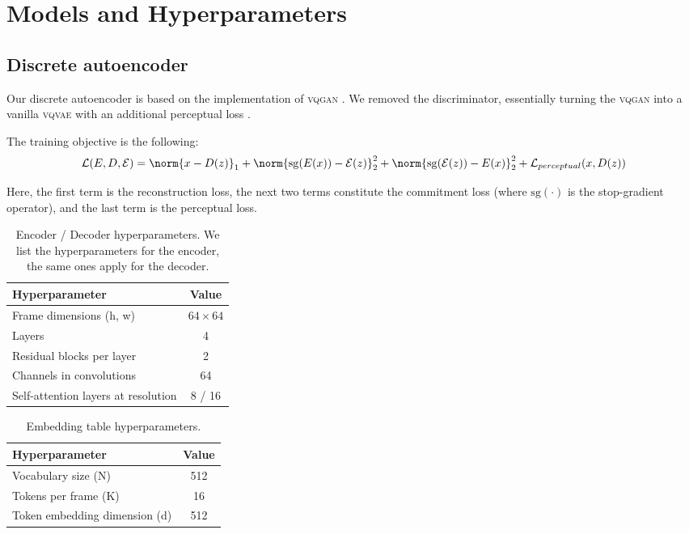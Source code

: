 \section{Models and Hyperparameters}
\label{appendix:architectures}

\subsection{Discrete autoencoder}

Our discrete autoencoder is based on the implementation of \textsc{vqgan} \citep{vqgan}. We removed the discriminator, essentially turning the \textsc{vqgan} into a vanilla \textsc{vqvae} \citep{vqvae} with an additional perceptual loss \citep{johnson, larsen}.

The training objective is the following:
\begin{equation*}
    \mathcal{L}(E, D, \mathcal{E}) = \norm{x - D(z)}_{1} + \norm{\mathrm{sg}(E(x)) - \mathcal{E}(z)}^{2}_{2} + \norm{\mathrm{sg}(\mathcal{E}(z)) - E(x)}^{2}_{2} + \mathcal{L}_{perceptual}(x, D(z))
\end{equation*}

Here, the first term is the reconstruction loss, the next two terms constitute the commitment loss (where $\mathrm{sg}(\cdot)$ is the stop-gradient operator), and the last term is the perceptual loss. 

\begin{table}[h]
  \caption{Encoder / Decoder hyperparameters. We list the hyperparameters for the encoder, the same ones apply for the decoder.}
  \label{tables:autoencoder}
  \centering
  \begin{tabular}{lc}
    \toprule
    Hyperparameter     & Value \\
    \midrule
    Frame dimensions (h, w) & $64 \times 64$ \\
    Layers & 4 \\
    Residual blocks per layer & 2 \\
    Channels in convolutions & 64 \\
    Self-attention layers at resolution & 8 / 16 \\
    \bottomrule
  \end{tabular}
\end{table}

\begin{table}[h]
  \caption{Embedding table hyperparameters.}
  \label{tables:autoencoder-embedding}
  \centering
  \begin{tabular}{lc}
    \toprule
    Hyperparameter     & Value \\
    \midrule
    Vocabulary size (N) & 512 \\
    Tokens per frame (K) & 16 \\
    Token embedding dimension (d) & 512 \\
    \bottomrule
  \end{tabular}
\end{table}


